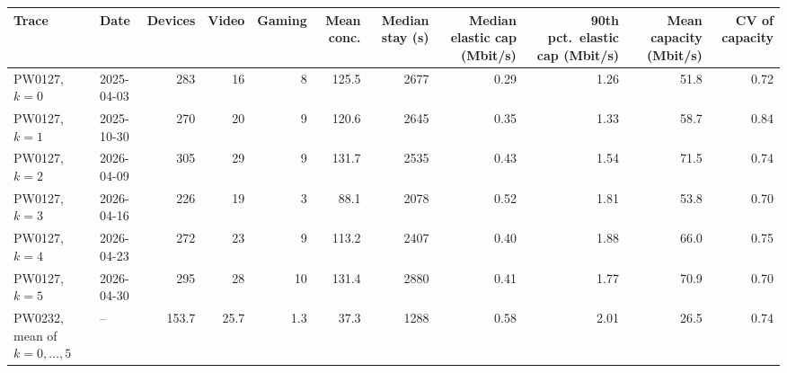 \begin{tabular}{llrrrrrrrrr}
\toprule
Trace & Date & Devices & Video & Gaming & Mean conc. & Median stay (s) & Median elastic cap (Mbit/s) & 90th pct.\ elastic cap (Mbit/s) & Mean capacity (Mbit/s) & CV of capacity \\
\midrule
PW0127, $k=0$ & 2025-04-03 & 283 & 16 & 8 & 125.5 & 2677 & 0.29 & 1.26 & 51.8 & 0.72 \\
PW0127, $k=1$ & 2025-10-30 & 270 & 20 & 9 & 120.6 & 2645 & 0.35 & 1.33 & 58.7 & 0.84 \\
PW0127, $k=2$ & 2026-04-09 & 305 & 29 & 9 & 131.7 & 2535 & 0.43 & 1.54 & 71.5 & 0.74 \\
PW0127, $k=3$ & 2026-04-16 & 226 & 19 & 3 & 88.1 & 2078 & 0.52 & 1.81 & 53.8 & 0.70 \\
PW0127, $k=4$ & 2026-04-23 & 272 & 23 & 9 & 113.2 & 2407 & 0.40 & 1.88 & 66.0 & 0.75 \\
PW0127, $k=5$ & 2026-04-30 & 295 & 28 & 10 & 131.4 & 2880 & 0.41 & 1.77 & 70.9 & 0.70 \\
\midrule
PW0232, mean of $k=0,\dots,5$ & -- & 153.7 & 25.7 & 1.3 & 37.3 & 1288 & 0.58 & 2.01 & 26.5 & 0.74 \\
\bottomrule
\end{tabular}
